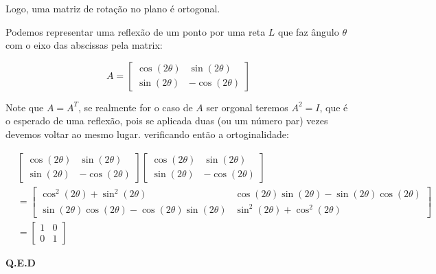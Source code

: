 \documentclass[12pt,letterpaper]{article}
\begin{document}
\begin{enumerate}
	Logo, uma matriz de rotação no plano é ortogonal.
	
	Podemos representar uma reflexão de um ponto por uma reta $L$ que faz ângulo $\theta$ com o eixo das abscissas pela matrix\cite{wiki:Rotations_and_reflections_in_two_dimensions}: 
	
	$$A=\begin{bmatrix}
		\cos(2\theta)&\sin(2\theta)\\
		\sin(2\theta)&-\cos(2\theta)
	\end{bmatrix}$$

	Note que $A=A^T$, se realmente for o caso de $A$ ser orgonal teremos $A^2=I$, que é o esperado de uma reflexão, pois se aplicada duas (ou um número par) vezes devemos voltar ao mesmo lugar. verificando então a ortoginalidade:
	
	\begin{align*}
		&\begin{bmatrix}
			\cos(2\theta)&\sin(2\theta)\\
			\sin(2\theta)&-\cos(2\theta)
		\end{bmatrix}\begin{bmatrix}
		\cos(2\theta)&\sin(2\theta)\\
		\sin(2\theta)&-\cos(2\theta)
	\end{bmatrix}\\
	&=\begin{bmatrix}
		\cos^2 (2\theta) +\sin^2(2\theta)&\cos(2\theta)\sin(2\theta)-\sin(2\theta)\cos(2\theta)\\
		\sin(2\theta)\cos(2\theta)-\cos(2\theta)\sin(2\theta) &\sin^2(2\theta)+\cos^2(2\theta)
	\end{bmatrix}\\&=\begin{bmatrix}
		1 &0\\
		0 &1
	\end{bmatrix}
	\end{align*} 

	\textbf{Q.E.D}


	
	
	
	\end{enumerate}
	
	\newpage
	
	
	
\end{document}
